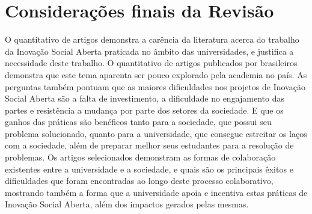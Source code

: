 

\section{Considerações finais da Revisão}

O quantitativo de artigos demonstra a carência da literatura acerca do trabalho da Inovação Social Aberta praticada no âmbito das universidades, e justifica a necessidade deste trabalho. O quantitativo de artigos publicados por brasileiros demonstra que este tema aparenta ser pouco explorado pela academia no país. As perguntas também pontuam que as maiores dificuldades nos projetos de Inovação Social Aberta são a falta de investimento, a dificuldade no engajamento das partes e resistência a mudança por parte dos setores da sociedade. E que os ganhos das práticas são benéficos tanto para a sociedade, que possui seu problema solucionado, quanto para a universidade, que consegue estreitar os laços com a sociedade, além de preparar melhor seus estudantes para a resolução de problemas. Os artigos selecionados demonstram as formas de colaboração existentes entre a universidade e a sociedade, e quais são os principais êxitos e dificuldades que foram encontradas ao longo deste processo colaborativo, mostrando também a forma que a universidade apoia e incentiva estas práticas de Inovação Social Aberta, além dos impactos gerados pelas mesmas.
